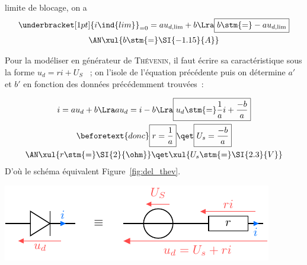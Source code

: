 \documentclass[../DS02.tex]{subfiles}%
\begin{document}
{\begin{itemize}
\begin{isd}
\begin{itemize}
				            limite de blocage, on a
				            \begin{gather*}
					            \underbracket[1pt]{i\ind{lim}}_{=0} = a u_{d,\rm lim} + b
					            \Lra
					            \boxed{b \stm{=} -a u_{d,\rm lim}}
					            \\
					            \AN
					            \xul{b \stm{=} \SI{-1.15}{A}}
				            \end{gather*}
			      \end{itemize}
		      \end{isd}
		      Pour la modéliser en générateur de \textsc{Thévenin}, il faut écrire
		      sa
		      caractéristique sous la forme $u_d = ri + U_S$ ~; on l'isole de
		      l'équation précédente puis on détermine $a'$ et $b'$ en fonction des
		      données précédemment trouvées~:
		      \smallbreak
		      \begin{isd}
			      \begin{gather*}
				      i = a u_d + b
				      \Lra
				      au_d = i - b
				      \Lra
				      \boxed{u_d \stm{=} \frac{1}{a}i + \frac{-b}{a}}
				      \\\beforetext{donc}
				      \boxed{r = \frac{1}{a}}
				      \qet
				      \boxed{U_s = \frac{-b}{a}}
				      \\\AN
				      \xul{r \stm{=} \SI{2}{\ohm}}
				      \qet
				      \xul{U_s \stm{=} \SI{2.3}{V}}
			      \end{gather*}
			      \tcblower
			      D'où le schéma équivalent Figure~\ref{fig:del_thev}.
			      \begin{center}
				      \includegraphics[scale=1]{diode_thevenin}
				      \label{fig:del_thev}
			      \end{center}
		      \end{isd}
	\end{itemize}
}%
\end{document}
